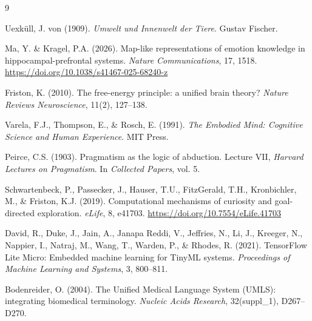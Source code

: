 \documentclass[11pt]{article}
\begin{document}
\begin{thebibliography}{9}

Uexküll, J. von (1909). \emph{Umwelt und Innenwelt der Tiere}. Gustav Fischer.

Ma, Y. \& Kragel, P.A. (2026). Map-like representations of emotion knowledge in hippocampal-prefrontal systems. \emph{Nature Communications}, 17, 1518. \url{https://doi.org/10.1038/s41467-025-68240-z}

Friston, K. (2010). The free-energy principle: a unified brain theory? \emph{Nature Reviews Neuroscience}, 11(2), 127--138.

Varela, F.J., Thompson, E., \& Rosch, E. (1991). \emph{The Embodied Mind: Cognitive Science and Human Experience}. MIT Press.

Peirce, C.S. (1903). Pragmatism as the logic of abduction. Lecture VII, \emph{Harvard Lectures on Pragmatism}. In \emph{Collected Papers}, vol. 5.

Schwartenbeck, P., Passecker, J., Hauser, T.U., FitzGerald, T.H., Kronbichler, M., \& Friston, K.J. (2019). Computational mechanisms of curiosity and goal-directed exploration. \emph{eLife}, 8, e41703. \url{https://doi.org/10.7554/eLife.41703}

David, R., Duke, J., Jain, A., Janapa Reddi, V., Jeffries, N., Li, J., Kreeger, N., Nappier, I., Natraj, M., Wang, T., Warden, P., \& Rhodes, R. (2021). TensorFlow Lite Micro: Embedded machine learning for TinyML systems. \emph{Proceedings of Machine Learning and Systems}, 3, 800--811.

Bodenreider, O. (2004). The Unified Medical Language System (UMLS): integrating biomedical terminology. \emph{Nucleic Acids Research}, 32(suppl\_1), D267--D270.

\end{thebibliography}
\end{document}

